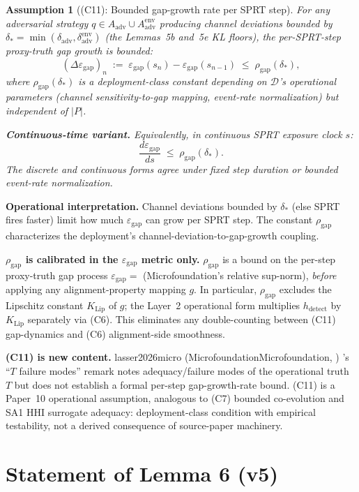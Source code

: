 \documentclass{article}
\makeatletter
\newcommand{\citep}[2][]{%
  \begingroup
  \def\@tmpkey{#2}%
  \ifx\@tmpkey\@empty\else
    (\ifx\@empty#1\@empty\else #1, \fi
     \@nameuse{bibkey@\@tmpkey})%
  \fi
  \endgroup
}
\newtheorem{assumption}{Assumption}
\newcommand{\Aadv}{A_{\mathrm{adv}}}
\newcommand{\deltaadv}{\delta_{\mathrm{adv}}}
\newcommand{\deltastar}{\delta_{*}}
\newcommand{\rhogap}{\rho_{\mathrm{gap}}}
\newcommand{\epsgap}{\varepsilon_{\mathrm{gap}}}
\makeatother
\begin{document}
\begin{assumption}[(C11): Bounded gap-growth rate per SPRT step]
\label{ass:C11}
For any adversarial strategy $q \in \Aadv \cup
\Aadv^{\mathrm{env}}$ producing channel deviations bounded by
$\deltastar = \min(\deltaadv, \delta_{\mathrm{adv}}^{\mathrm{env}})$
(the Lemmas~5b and~5e KL floors), the per-SPRT-step proxy-truth
gap growth is bounded:
\[
  (\Delta \epsgap)_n \;:=\; \epsgap(s_n) - \epsgap(s_{n-1}) \;\leq\;
  \rhogap(\deltastar),
\]
where $\rhogap(\deltastar)$ is a deployment-class constant
depending on $\mathcal{D}$'s operational parameters (channel
sensitivity-to-gap mapping, event-rate normalization) but
independent of $|P|$.

\textbf{Continuous-time variant.}  Equivalently, in continuous
SPRT exposure clock $s$:
\[
  \frac{d \epsgap}{ds} \;\leq\; \rhogap(\deltastar).
\]
The discrete and continuous forms agree under fixed step duration
or bounded event-rate normalization.
\end{assumption}

\textbf{Operational interpretation.}  Channel deviations bounded by
$\deltastar$ (else SPRT fires faster) limit how much $\epsgap$ can
grow per SPRT step.  The constant $\rhogap$ characterizes the
deployment's channel-deviation-to-gap-growth coupling.

\textbf{$\rhogap$ is calibrated in the $\epsgap$ metric only.}
$\rhogap$ is a bound on the per-step proxy-truth gap process
$\epsgap = $ (Microfoundation's relative sup-norm), \emph{before}
applying any alignment-property mapping $g$.  In particular,
$\rhogap$ excludes the Lipschitz constant $K_{\mathrm{Lip}}$ of $g$;
the Layer~2 operational form multiplies $h_{\mathrm{detect}}$ by
$K_{\mathrm{Lip}}$ separately via (C6).  This eliminates any
double-counting between (C11) gap-dynamics and (C6) alignment-side
smoothness.

\textbf{(C11) is new content.}  \citep[Microfoundation]{lasser2026micro}'s
``$T$ failure modes'' remark notes adequacy/failure modes of the
operational truth $T$ but does not establish a formal per-step
gap-growth-rate bound.  (C11) is a Paper~10 operational assumption,
analogous to (C7) bounded co-evolution and SA1 HHI surrogate
adequacy: deployment-class condition with empirical testability,
not a derived consequence of source-paper machinery.

\section{Statement of Lemma 6 (v5)}
\end{document}
